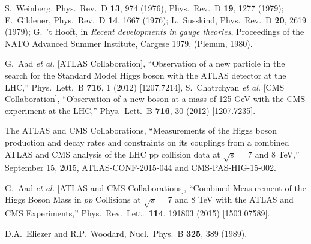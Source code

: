 \documentclass[12pt]{article}
\begin{document}
\begin{thebibliography}{999}
\baselineskip11.75pt
\parskip-1pt

S.~Weinberg, 
  Phys.\ Rev.\ D {\bf 13}, 974 (1976),
  Phys.\ Rev.\ D {\bf 19}, 1277 (1979);
E.~Gildener,
  Phys.\ Rev.\ D {\bf 14}, 1667 (1976);
L.~Susskind, 
  Phys.\ Rev.\ D {\bf 20}, 2619 (1979);
G.~'t Hooft, in {\it Recent developments in gauge theories}, Proceedings 
of the NATO Advanced Summer Institute, Cargese 1979, (Plenum, 1980).

G.~Aad {\it et al.}  [ATLAS Collaboration],
  ``Observation of a new particle in the search for the Standard Model
  Higgs boson with the ATLAS detector at the LHC,''
  Phys.\ Lett.\ B {\bf 716}, 1 (2012)
  [1207.7214],
  S.~Chatrchyan {\it et al.}  [CMS Collaboration],
  ``Observation of a new boson at a mass of 125 GeV with the CMS experiment
  at the LHC,''
  Phys.\ Lett.\ B {\bf 716}, 30 (2012)
  [1207.7235].

  The ATLAS and CMS Collaborations,
  ``Measurements of the Higgs boson production and decay rates and constraints 
  on its   couplings from a combined ATLAS and CMS analysis of the LHC pp 
  collision data at $\sqrt{s}$ = 7 and 8 TeV,''
  September 15, 2015,
  ATLAS-CONF-2015-044 and CMS-PAS-HIG-15-002.

  G.~Aad {\it et al.} [ATLAS and CMS Collaborations],
  ``Combined Measurement of the Higgs Boson Mass in $pp$ Collisions at 
  $\sqrt{s}=7$ and 8    TeV with the ATLAS and CMS Experiments,''
  Phys.\ Rev.\ Lett.\ {\bf 114}, 191803 (2015)
  [1503.07589].
  
D.A.~Eliezer and R.P.~Woodard,
  Nucl.\ Phys.\ B {\bf 325}, 389 (1989).


\end{thebibliography}
\end{document}
